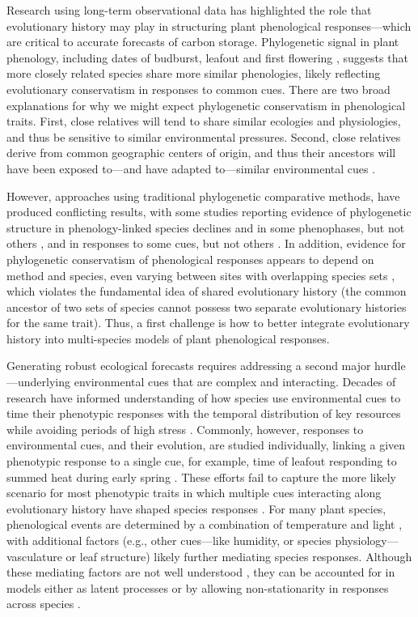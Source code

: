 \documentclass{article}
\begin{document}
Research using long-term observational data has highlighted the role that evolutionary history may play in structuring plant phenological responses---which are critical to accurate forecasts of carbon storage. Phylogenetic signal in plant phenology, including dates of budburst, leafout and first flowering \citep{kochmer1986constraints,willis2008phylogenetic,davies2013phylogenetic}, suggests that more closely related species share more similar phenologies, likely reflecting evolutionary conservatism in responses to common cues. There are two broad explanations for why we might expect phylogenetic conservatism in phenological traits. First, close relatives will tend to share similar ecologies and physiologies, and thus be sensitive to similar environmental pressures. Second, close relatives derive from common geographic centers of origin, and thus their ancestors will have been exposed to---and have adapted to---similar environmental cues \citep{davies2013phylogenetic}. 


However, approaches using traditional phylogenetic comparative methods, have produced conflicting results, with some studies reporting evidence of phylogenetic structure in phenology-linked species declines \citep[e.g.,][]{willis2008phylogenetic} and in some phenophases, but not others \citep[e.g.,][]{CaraDonna2015}, and in responses to some cues, but not others \citep[e.g.,][]{yang2021afm}. In addition, evidence for phylogenetic conservatism of phenological responses appears to depend on method and species, even varying between sites with overlapping species sets \citep[e.g.,][]{rafferty2017global}, which violates the fundamental idea of shared evolutionary history (the common ancestor of two sets of species cannot possess two separate evolutionary histories for the same trait). Thus, a first challenge is how to better integrate evolutionary history into multi-species models of plant phenological responses.

Generating robust ecological forecasts requires addressing a second major hurdle---underlying environmental cues that are complex and interacting. Decades of research have informed understanding of how species use environmental cues to time their phenotypic responses with the temporal distribution of key resources while avoiding periods of high stress \citep{larcher1980,bonamour2019}. Commonly, however, responses to environmental cues, and their evolution, are studied individually, linking a given phenotypic response to a single cue, for example, time of leafout responding to summed heat during early spring \citep{davies2013phylogenetic}. These efforts fail to capture the more likely scenario for most phenotypic traits in which multiple cues interacting along evolutionary history have shaped species responses \citep{Ackerly:2009ly}. For many plant species, phenological events are determined by a combination of temperature and light \citep{chuinearees}, with additional factors (e.g., other cues---like humidity, or species physiology---vasculature or leaf structure) likely further mediating species responses. Although these mediating factors are not well understood \citep{chuinearees}, they can be accounted for in models either as latent processes or by allowing non-stationarity in responses across species \citep{davies2019phylogenetically}.  
\end{document}
